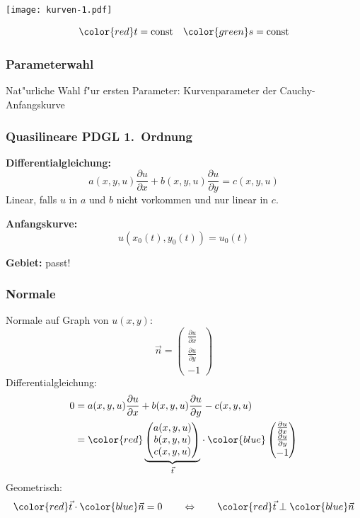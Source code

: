 \documentclass{beamer}
\begin{document}
\begin{frame}
\frametitle{}
\begin{center}
\texttt{[image: kurven-1.pdf]}
\end{center}
\[
\color{red} t=\text{const}
\quad
\color{green} s=\text{const}
\]
\end{frame}

\begin{frame}
\frametitle{Parameterwahl}
Nat"urliche Wahl f"ur ersten Parameter: Kurvenparameter der Cauchy-Anfangskurve
\end{frame}

\begin{frame}
\frametitle{Quasilineare PDGL 1.~Ordnung}
{\bf Differentialgleichung:}
\[
a(x,y,u)\frac{\partial u}{\partial x}+b(x,y,u)\frac{\partial u}{\partial y}
=c(x,y,u)
\]
\pause
Linear, falls $u$ in $a$ und $b$ nicht vorkommen und nur linear in $c$.
\pause

\medskip

{\bf Anfangskurve:}
\pause
\[
u(x_0(t),y_0(t))=u_0(t)
\]
\pause

\smallskip

{\bf Gebiet:} \pause passt!
\end{frame}

\begin{frame}
\frametitle{Normale}
Normale auf Graph von $u(x,y)$:
\pause
\[
\vec n=\begin{pmatrix}
\frac{\partial u}{\partial x}\\
\frac{\partial u}{\partial y}\\
-1
\end{pmatrix}
\]
\pause
Differentialgleichung:
\begin{align*}
0
&=
a(x,y,u)\frac{\partial u}{\partial x}
+
b(x,y,u)\frac{\partial u}{\partial y}
-
c(x,y,u)
\\
&=
{\color{red}
\underbrace{
\begin{pmatrix}
a(x,y,u)\\
b(x,y,u)\\
c(x,y,u)
\end{pmatrix}
}_{\vec t}
}
\cdot
{\color{blue}
\begin{pmatrix}
\frac{\partial u}{\partial x}\\
\frac{\partial u}{\partial y}\\
-1
\end{pmatrix}
}
\end{align*}
\pause
Geometrisch:
\[
{\color{red}\vec t}
\cdot
{\color{blue}\vec n}
=0
\qquad
\Leftrightarrow
\qquad
{\color{red}\vec t}
\perp
{\color{blue}\vec n}
\]

\end{frame}
\end{document}
